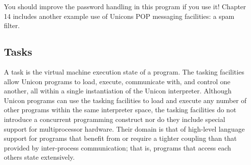 
\noindent
You should improve the password handling in this program if you use it!
Chapter 14 includes another example use of
Unicon{\textquotesingle}s POP messaging facilities: a spam filter.

\subsection{Tasks}

A task is the virtual machine execution state of a program. The tasking
facilities allow Unicon programs to load, execute, communicate with,
and control one another, all within a single instantiation of the
Unicon interpreter. 
Although Unicon programs can use the tasking facilities to load and
execute any number of other programs within the same interpreter space,
the tasking facilities do not introduce a concurrent programming
construct nor do they include special support for multiprocessor
hardware. Their domain is that of high-level language support for
programs that benefit from or require a tighter coupling than that
provided by inter-process communication; that is, programs that access
each other{\textquotesingle}s state extensively.

